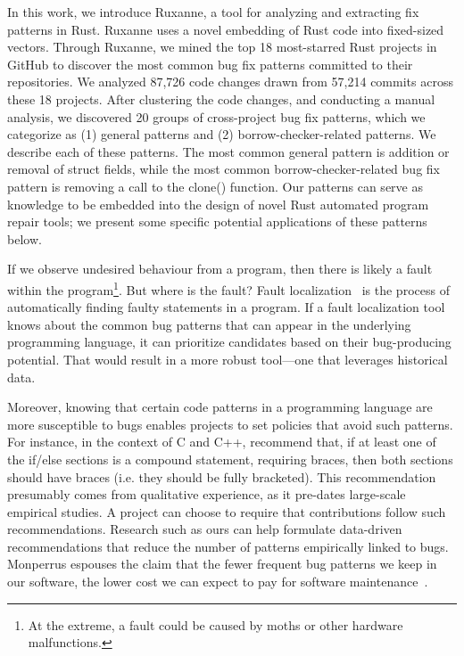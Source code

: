 In this work, we introduce Ruxanne, a tool for analyzing and extracting fix patterns in Rust. Ruxanne uses a novel embedding of Rust code into fixed-sized vectors. Through Ruxanne, we mined the top 18 most-starred Rust projects in GitHub to discover the most common bug fix patterns committed to their repositories. We analyzed 87,726 code changes drawn from 57,214 commits across these 18 projects. After clustering the code changes, and conducting a manual analysis, we discovered 20 groups of cross-project bug fix patterns, which we categorize as (1) general patterns and (2) borrow-checker-related patterns. We describe each of these patterns. The most common general pattern is addition or removal of struct fields, while the most common borrow-checker-related bug fix pattern is removing a call to the clone() function. Our patterns can serve as knowledge to be embedded into the design of novel Rust automated program repair tools; we present some specific potential applications of these patterns below.

If we observe undesired behaviour from a program, then there is likely a fault within the program\footnote{At the extreme, a fault could be caused by moths or other hardware malfunctions.}. But where is the fault? Fault localization~\citep{wong2016survey} is the process of automatically finding faulty statements in a program. If a fault localization tool knows about the common bug patterns that can appear in the underlying programming language, it can prioritize candidates based on their bug-producing potential. That would result in a more robust tool---one that leverages historical data.

Moreover, knowing that certain code patterns in a programming language are more susceptible to bugs enables projects to set policies that avoid such patterns. For instance, in the context of C and C++, \cite{Cannon1997RecommendedCS} recommend that, if at least one of the if/else sections is a compound statement, requiring braces, then both sections should have braces (i.e. they should be fully bracketed). This recommendation presumably comes from qualitative experience, as it pre-dates large-scale empirical studies. A project can choose to require that contributions follow such recommendations. Research such as ours can help formulate data-driven recommendations that reduce the number of patterns empirically linked to bugs. Monperrus espouses the claim that the fewer frequent bug patterns we keep in our software, the lower cost we can expect to pay for software maintenance~\citep{monperrus2014critical}.

